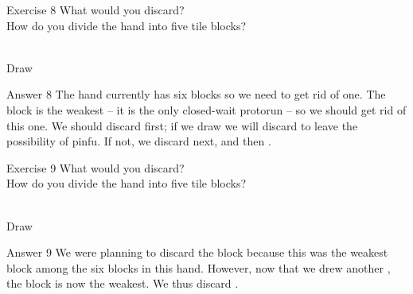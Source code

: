 \bigskip

\begin{itembox}[l]{Exercise 8}
What would you discard? \\
\vsp
How do you divide the hand into five tile blocks? 

\bp
{}~\\
\hfill\footnotesize{Draw~~~~~~~~~~~}
\ep
\end{itembox}

\newpage

\begin{itembox}[r]{Answer 8}
\emj
The hand currently has six blocks so we need to get rid of one. The {\LARGE{}} block is the weakest -- it is the only closed-wait protorun -- so we should get rid of this one. We should discard {\LARGE{}} first; if we draw {\LARGE{}} we will discard {\LARGE{}} to leave the possibility of {\jap pinfu}. If not, we discard {\LARGE{}} next, and then  {\LARGE{}}. 
\end{itembox}

\vfill

\begin{itembox}[l]{Exercise 9}
What would you discard? \\
\vsp
How do you divide the hand into five tile blocks? 

\bp
{}\bai\bai~\\
\hfill\footnotesize{Draw~~~~~~~~~~~}
\ep
\end{itembox}

\newpage

\begin{itembox}[r]{Answer 9}
\emj
We were planning to discard the {\LARGE{}} block because this was the weakest block among the six blocks in this hand. However, now that we drew another {\LARGE{}}, the {\LARGE{}} block is now the weakest. We thus discard {\LARGE{}}.
\end{itembox}

